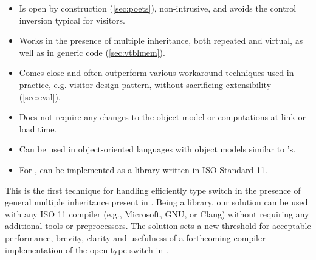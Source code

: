   \begin{itemize}
  \setlength{\itemsep}{0pt}
  \setlength{\parskip}{0pt}
  \item Is open by construction (\textsection\ref{sec:poets}), non-intrusive, 
        and avoids the control inversion typical for visitors. 
  \item Works in the presence of multiple inheritance, both repeated and 
        virtual, as well as in generic code (\textsection\ref{sec:vtblmem}).
  \item Comes close and often outperform various workaround techniques used in 
        practice, e.g. visitor design pattern, without sacrificing extensibility
        (\textsection\ref{sec:eval}). 
  \item Does not require any changes to the \Cpp{} object model or computations at 
        link or load time. 
  \item Can be used in object-oriented languages with 
        object models similar to \Cpp{}'s.
  \item For \Cpp{}, can be implemented as a library written in ISO Standard \Cpp{}11.
  \end{itemize}

\noindent
This is the first technique for handling efficiently type switch in the presence 
of general multiple inheritance present in \Cpp{}.
Being a library, our solution can be used with any 
ISO \Cpp{}11 compiler (e.g., Microsoft, GNU, or Clang) without requiring 
any additional tools or preprocessors. The solution
sets a new threshold for acceptable performance, brevity, clarity and
usefulness of a forthcoming compiler implementation of the open type switch in \Cpp{}.

